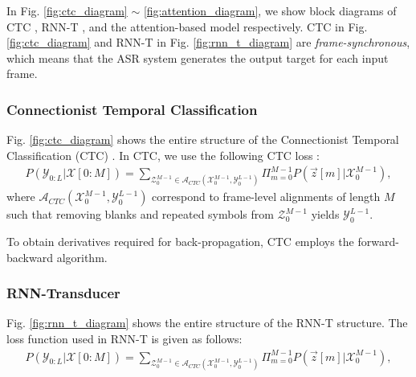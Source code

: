 \documentclass{article}
\begin{document}
 In Fig. 
\ref{fig:ctc_diagram} $\sim$ \ref{fig:attention_diagram}, we show
block diagrams of CTC \cite{a_graves_icml_2006_00}, 
RNN-T \cite{a_graves_corr_2012_00, a_graves_icassp_2013_00}, and 
the attention-based model 
\cite{
j_chorowski_nips_2015_00,
w_chan_icassp_2016_00} respectively. CTC in Fig. \ref{fig:ctc_diagram} 
and RNN-T in Fig. \ref{fig:rnn_t_diagram} are {\it frame-synchronous}, 
which means that the ASR system generates the output target for each 
input frame.


\subsubsection{Connectionist Temporal Classification}
\label{sec:ctc}

Fig. \ref{fig:ctc_diagram} shows the entire structure of the 
Connectionist Temporal Classification (CTC) 
\cite{a_graves_icml_2006_00}. In CTC, we use the following CTC loss
\cite{a_graves_icml_2006_00, y_he_icassp_2019_00}:
\begin{align}
  P\left(\mathcal{Y}_{0:L} | \mathcal{X}[0:M]\right) = 
    \sum_{\mathcal{Z}_{0}^{M-1} \in 
      \mathcal{A}_{CTC} 
        \left(\mathcal{X}_{0}^{M-1}, \mathcal{Y}_{0}^{L-1} \right)}
          \Pi_{m=0}^{M-1}
            P\left(\vec{z}[m] | \mathcal{X}_{0}^{M-1} \right),
\end{align}
where $\mathcal{A}_{CTC} \left(\mathcal{X}_{0}^{M-1}, 
\mathcal{Y}_{0}^{L-1} \right)$ correspond to frame-level alignments
of length $M$ such that removing blanks and repeated symbols from 
$\mathcal{Z}_{0}^{M-1}$ yields $\mathcal{Y}_{0}^{L-1}$.

To obtain derivatives required for back-propagation, CTC employs 
the forward-backward algorithm.



\subsubsection{RNN-Transducer}
\label{sec:rnn_t}

Fig. \ref{fig:rnn_t_diagram} shows the entire structure of the  
RNN-T structure. The loss function used in RNN-T is given as follows:
\begin{align}
  P\left(\mathcal{Y}_{0:L} | \mathcal{X}[0:M]\right) = 
    \sum_{\mathcal{Z}_{0}^{M-1} \in 
      \mathcal{A}_{CTC} 
        \left(\mathcal{X}_{0}^{M-1}, \mathcal{Y}_{0}^{L-1} \right)}
          \Pi_{m=0}^{M-1}
            P\left(\vec{z}[m] | \mathcal{X}_{0}^{M-1} \right),
\end{align}
\end{document}
